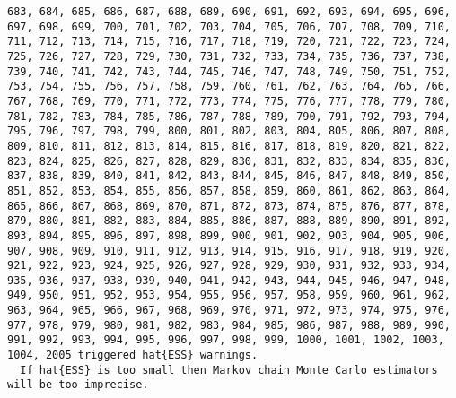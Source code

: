 \documentclass[
  letterpaper,
  DIV=11,
  numbers=noendperiod]{scrartcl}
\begin{document}
\begin{verbatim}
683, 684, 685, 686, 687, 688, 689, 690, 691, 692, 693, 694, 695, 696, 697, 698, 699, 700, 701, 702, 703, 704, 705, 706, 707, 708, 709, 710, 711, 712, 713, 714, 715, 716, 717, 718, 719, 720, 721, 722, 723, 724, 725, 726, 727, 728, 729, 730, 731, 732, 733, 734, 735, 736, 737, 738, 739, 740, 741, 742, 743, 744, 745, 746, 747, 748, 749, 750, 751, 752, 753, 754, 755, 756, 757, 758, 759, 760, 761, 762, 763, 764, 765, 766, 767, 768, 769, 770, 771, 772, 773, 774, 775, 776, 777, 778, 779, 780, 781, 782, 783, 784, 785, 786, 787, 788, 789, 790, 791, 792, 793, 794, 795, 796, 797, 798, 799, 800, 801, 802, 803, 804, 805, 806, 807, 808, 809, 810, 811, 812, 813, 814, 815, 816, 817, 818, 819, 820, 821, 822, 823, 824, 825, 826, 827, 828, 829, 830, 831, 832, 833, 834, 835, 836, 837, 838, 839, 840, 841, 842, 843, 844, 845, 846, 847, 848, 849, 850, 851, 852, 853, 854, 855, 856, 857, 858, 859, 860, 861, 862, 863, 864, 865, 866, 867, 868, 869, 870, 871, 872, 873, 874, 875, 876, 877, 878, 879, 880, 881, 882, 883, 884, 885, 886, 887, 888, 889, 890, 891, 892, 893, 894, 895, 896, 897, 898, 899, 900, 901, 902, 903, 904, 905, 906, 907, 908, 909, 910, 911, 912, 913, 914, 915, 916, 917, 918, 919, 920, 921, 922, 923, 924, 925, 926, 927, 928, 929, 930, 931, 932, 933, 934, 935, 936, 937, 938, 939, 940, 941, 942, 943, 944, 945, 946, 947, 948, 949, 950, 951, 952, 953, 954, 955, 956, 957, 958, 959, 960, 961, 962, 963, 964, 965, 966, 967, 968, 969, 970, 971, 972, 973, 974, 975, 976, 977, 978, 979, 980, 981, 982, 983, 984, 985, 986, 987, 988, 989, 990, 991, 992, 993, 994, 995, 996, 997, 998, 999, 1000, 1001, 1002, 1003, 1004, 2005 triggered hat{ESS} warnings.
  If hat{ESS} is too small then Markov chain Monte Carlo estimators will be too imprecise.
\end{verbatim}
\end{document}
